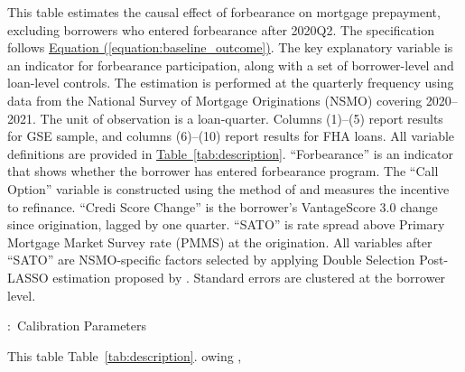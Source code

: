 \documentclass[11pt]{article}
\begin{document}
{\begin{table}[htbp]
\begin{minipage}{\textwidth}
\small
This table estimates the causal effect of forbearance on mortgage prepayment, excluding borrowers who entered forbearance after 2020Q2. The specification follows \hyperref[equation:baseline_outcome]{Equation (\ref*{equation:baseline_outcome})}. The key explanatory variable is an indicator for forbearance participation, along with a set of borrower-level and loan-level controls. The estimation is performed at the quarterly frequency using data from the National Survey of Mortgage Originations (NSMO) covering 2020–2021. The unit of observation is a loan-quarter. Columns (1)–(5) report results for GSE sample, and columns (6)–(10) report results for FHA loans. All variable definitions are provided in \hyperref[tab:description]{Table~\ref*{tab:description}}. ``Forbearance'' is an indicator that shows whether the borrower has entered forbearance program. The ``Call Option'' variable is constructed using the method of \citet{deng2000mortgage} and measures the incentive to refinance. ``Credi Score Change'' is the borrower’s VantageScore 3.0 change since origination, lagged by one quarter. ``SATO'' is rate spread above Primary Mortgage Market Survey rate (PMMS) at the origination. All variables after ``SATO'' are NSMO-specific factors selected by applying Double Selection Post-LASSO estimation proposed by \citet{belloni2014inference}. Standard errors are clustered at the borrower level. 

\end{minipage}

\vspace{1em}



\end{table}
\FloatBarrier
\clearpage






\begin{table}[!h]
\captionsetup{justification=justified,singlelinecheck=false}
\footnotesize
\caption{:\ Calibration Parameters}
\label{tab:calibration}
\vspace{0.5em}

\begin{minipage}{\textwidth}
\small
This table  Table~\ref*{tab:description}. owing \citet{deng2000mortgage}, 

\end{minipage}

\vspace{1em}


\end{table}}
\end{document}
